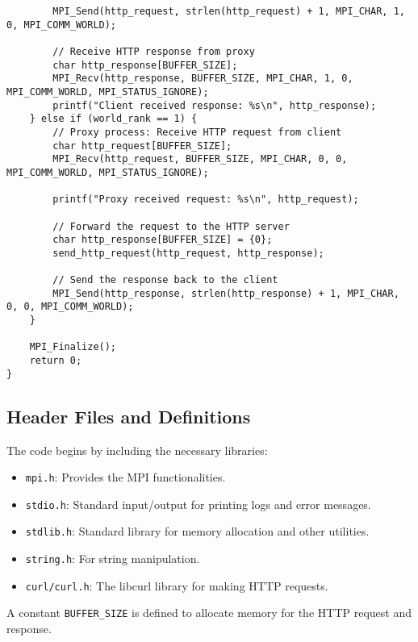 \documentclass[a4paper,12pt]{article}
\begin{document}
\begin{lstlisting}
        MPI_Send(http_request, strlen(http_request) + 1, MPI_CHAR, 1, 0, MPI_COMM_WORLD);

        // Receive HTTP response from proxy
        char http_response[BUFFER_SIZE];
        MPI_Recv(http_response, BUFFER_SIZE, MPI_CHAR, 1, 0, MPI_COMM_WORLD, MPI_STATUS_IGNORE);
        printf("Client received response: %s\n", http_response);
    } else if (world_rank == 1) {
        // Proxy process: Receive HTTP request from client
        char http_request[BUFFER_SIZE];
        MPI_Recv(http_request, BUFFER_SIZE, MPI_CHAR, 0, 0, MPI_COMM_WORLD, MPI_STATUS_IGNORE);

        printf("Proxy received request: %s\n", http_request);

        // Forward the request to the HTTP server
        char http_response[BUFFER_SIZE] = {0};
        send_http_request(http_request, http_response);

        // Send the response back to the client
        MPI_Send(http_response, strlen(http_response) + 1, MPI_CHAR, 0, 0, MPI_COMM_WORLD);
    }

    MPI_Finalize();
    return 0;
}
\end{lstlisting}
\subsection{Header Files and Definitions}
The code begins by including the necessary libraries:
\begin{itemize}
    \item \texttt{mpi.h}: Provides the MPI functionalities.
    \item \texttt{stdio.h}: Standard input/output for printing logs and error messages.
    \item \texttt{stdlib.h}: Standard library for memory allocation and other utilities.
    \item \texttt{string.h}: For string manipulation.
    \item \texttt{curl/curl.h}: The libcurl library for making HTTP requests.
\end{itemize}

A constant \texttt{BUFFER\_SIZE} is defined to allocate memory for the HTTP request and response.
\end{document}
